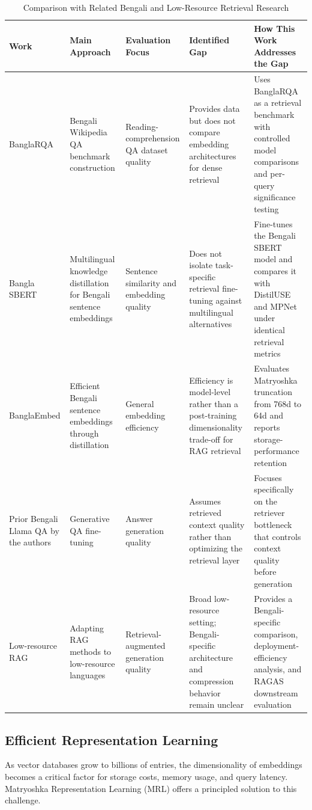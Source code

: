 \documentclass[manuscript,screen,review]{acmart}
\begin{document}
\begin{table}[t]
    \centering
    \caption{Comparison with Related Bengali and Low-Resource Retrieval Research}
    \label{tab:related_work_comparison}
    \small
    \begin{tabularx}{\textwidth}{L{2.6cm}L{2.7cm}L{2.7cm}Y Y}
        \toprule
        \textbf{Work} & \textbf{Main Approach} & \textbf{Evaluation Focus} & \textbf{Identified Gap} & \textbf{How This Work Addresses the Gap} \\
        \midrule
        BanglaRQA \cite{ekram2022banglarqa} & Bengali Wikipedia QA benchmark construction & Reading-comprehension QA dataset quality & Provides data but does not compare embedding architectures for dense retrieval & Uses BanglaRQA as a retrieval benchmark with controlled model comparisons and per-query significance testing \\
        Bangla SBERT \cite{uddin2024bangla} & Multilingual knowledge distillation for Bengali sentence embeddings & Sentence similarity and embedding quality & Does not isolate task-specific retrieval fine-tuning against multilingual alternatives & Fine-tunes the Bengali SBERT model and compares it with DistilUSE and MPNet under identical retrieval metrics \\
        BanglaEmbed \cite{kabir2024banglaembed} & Efficient Bengali sentence embeddings through distillation & General embedding efficiency & Efficiency is model-level rather than a post-training dimensionality trade-off for RAG retrieval & Evaluates Matryoshka truncation from 768d to 64d and reports storage-performance retention \\
        Prior Bengali Llama QA by the authors \cite{debanath2025advancing} & Generative QA fine-tuning & Answer generation quality & Assumes retrieved context quality rather than optimizing the retrieval layer & Focuses specifically on the retriever bottleneck that controls context quality before generation \\
        Low-resource RAG \cite{lin2024improving} & Adapting RAG methods to low-resource languages & Retrieval-augmented generation quality & Broad low-resource setting; Bengali-specific architecture and compression behavior remain unclear & Provides a Bengali-specific comparison, deployment-efficiency analysis, and RAGAS downstream evaluation \\
        \bottomrule
    \end{tabularx}
\end{table}

\subsection{Efficient Representation Learning}
As vector databases grow to billions of entries, the dimensionality of embeddings becomes a critical factor for storage costs, memory usage, and query latency. Matryoshka Representation Learning (MRL) \cite{kusupati2022matryoshka} offers a principled solution to this challenge.
\end{document}
